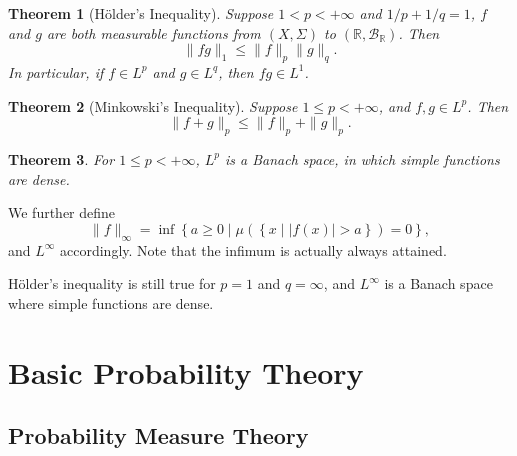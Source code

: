 \documentclass[openany]{book}
\newtheorem{theorem}{Theorem}[chapter]
\theoremstyle{definition}
\theoremstyle{remark}
\begin{document}
\begin{theorem}[H\"{o}lder's Inequality]
    Suppose $1<p<+\infty$ and $1/p+1/q=1$, $f$ and $g$ are both measurable functions from $(X,\Sigma)$ to $(\mathbb{R},\mathcal{B}_{\mathbb{R}})$. Then
    \begin{equation*}
        \|fg\|_1\le\|f\|_p\|g\|_q.
    \end{equation*}
    In particular, if $f\in L^p$ and $g\in L^q$, then $fg\in L^1$.
\end{theorem}
\begin{theorem}[Minkowski's Inequality]
    Suppose $1\le p<+\infty$, and $f,g\in L^p$. Then
    \begin{equation*}
        \|f+g\|_p\le\|f\|_p+\|g\|_p.
    \end{equation*}
\end{theorem}
\begin{theorem}
    For $1\le p<+\infty$, $L^p$ is a Banach space, in which simple functions are dense.
\end{theorem}

We further define
\begin{equation*}
    \|f\|_{\infty}=\inf\left\{a\ge0\middle|\mu\left(\left\{x\middle||f(x)|>a\right\}\right)=0\right\},
\end{equation*}
and $L^{\infty}$ accordingly. Note that the infimum is actually always attained.

H\"{o}lder's inequality is still true for $p=1$ and $q=\infty$, and $L^{\infty}$ is a Banach space where simple functions are dense.

\part{Basic Probability Theory}
\chapter{Probability Measure Theory}
\end{document}
